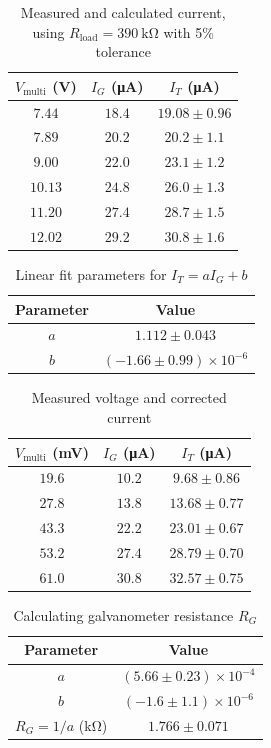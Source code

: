 \begin{table}[htb!]
\centering
\caption{Measured and calculated current, using $R_{\text{load}}=\qty{390}{\kohm}$ with 5\% tolerance}
\begin{tabular}{ccc}
\toprule
$V_{\text{multi}}$ (\unit{\V}) & $I_G$ (\unit{\uA}) & $I_T$ (\unit{\uA}) \\
\midrule
$7.44$ & $18.4$ & $19.08 \pm 0.96$ \\
$7.89$ & $20.2$ & $20.2 \pm 1.1$ \\
$9.00$ & $22.0$ & $23.1 \pm 1.2$ \\
$10.13$ & $24.8$ & $26.0 \pm 1.3$ \\
$11.20$ & $27.4$ & $28.7 \pm 1.5$ \\
$12.02$ & $29.2$ & $30.8 \pm 1.6$ \\
\bottomrule
\end{tabular}
\end{table}
\begin{table}[htb!]
\centering
\caption{Linear fit parameters for $I_T = a I_G + b$}
\begin{tabular}{cc}
\toprule
Parameter & Value \\
\midrule
$a$ & $1.112 \pm 0.043$ \\
$b$ & $(-1.66 \pm 0.99)\times 10^{-6}$ \\
\bottomrule
\end{tabular}
\end{table}
\begin{table}[htb!]
\centering
\caption{Measured voltage and corrected current}
\begin{tabular}{ccc}
\toprule
$V_{\text{multi}}$ (\unit{\mV}) & $I_G$ (\unit{\uA}) & $I_T$ (\unit{\uA}) \\
\midrule
$19.6$ & $10.2$ & $9.68 \pm 0.86$ \\
$27.8$ & $13.8$ & $13.68 \pm 0.77$ \\
$43.3$ & $22.2$ & $23.01 \pm 0.67$ \\
$53.2$ & $27.4$ & $28.79 \pm 0.70$ \\
$61.0$ & $30.8$ & $32.57 \pm 0.75$ \\
\bottomrule
\end{tabular}
\end{table}
\begin{table}[htb!]
\centering
\caption{Calculating galvanometer resistance $R_G$}
\begin{tabular}{cc}
\toprule
Parameter & Value \\
\midrule
$a$ & $(5.66 \pm 0.23)\times 10^{-4}$ \\
$b$ & $(-1.6 \pm 1.1)\times 10^{-6}$ \\
$R_G=1/a$ (\unit{\kohm}) & $1.766 \pm 0.071$ \\
\bottomrule
\end{tabular}
\end{table}
